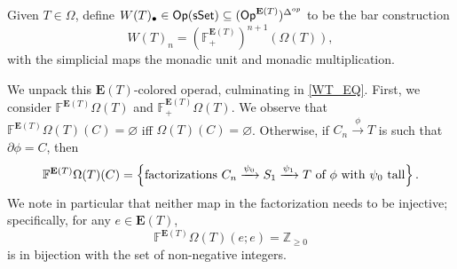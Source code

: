 \documentclass[a4paper,10pt
,draft
]{article}%
\renewcommand{\1}{\eta}%
\begin{document}
\begin{definition}
      Given $T \in \Omega$, define $W(T)_\bullet \in \mathsf{Op}(\mathsf{sSet}) \subseteq (\mathsf{Op}^{\mathbf E(T)})^{\Delta^{op}}$ to be the bar construction
      \[
            W(T)_n = \left( \mathbb F^{\mathbf E(T)}_+ \right)^{n+1} \left(\Omega(T)\right),
      \]
      with the simplicial maps the monadic unit and monadic multiplication.
\end{definition}

We unpack this $\mathbf E(T)$-colored operad, culminating in \eqref{WT_EQ}.
First, we consider $\mathbb F^{\mathbf E(T)} \Omega(T)$ and $\mathbb F^{\mathbf E(T)}_+ \Omega(T)$.
We observe that $\mathbb F^{\mathbf E(T)} \Omega(T)(C) = \varnothing$ iff $\Omega(T)(C) = \varnothing$.
Otherwise, if $C_n \xrightarrow{\phi} T$ is such that $\partial \phi = C$, then
\begin{equation}
      \label{FET_EQ}
      \mathbb F^{\mathbf E(T)}\Omega(T)(C)
      = \left\{\mbox{factorizations $C_n \xrightarrow{\psi_0} S_1 \xrightarrow{\psi_1} T$ of $\phi$ with $\psi_0$ tall}\right\}.
\end{equation}
We note in particular that neither map in the factorization needs to be injective;
specifically, for any $e \in \mathbf E(T)$,
\begin{equation}
      \label{FET_EE_EQ}
      \mathbb F^{\mathbf E(T)}\Omega(T)(e;e) = \mathbb Z_{\geq 0}
\end{equation}
is in bijection with the set of non-negative integers.
\end{document}
